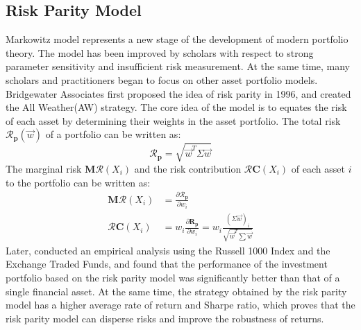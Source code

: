 \subsection{Risk Parity Model}
Markowitz model represents a new stage of the development of modern portfolio theory. The model has been improved by scholars with respect to strong parameter sensitivity and insufficient risk measurement. At the same time, many scholars and practitioners began to focus on other asset portfolio models.\\
Bridgewater Associates first proposed the idea of risk parity in 1996, and created the All Weather(AW) strategy. The core idea of the model is to equates the risk of each asset by determining their weights in the asset portfolio. The total risk $\boldsymbol{\mathcal{R}}_\mathbf{p}(\vec{w})$ of a portfolio can be written as:
 \begin{equation}
\boldsymbol{\mathcal{R}}_{\mathbf{p}}=\sqrt{\vec{w}^T \Sigma \vec{w}}  
 \end{equation}
The marginal risk $\boldsymbol{M}\boldsymbol{\mathcal{R}}(X_{i})$ and the risk contribution $\boldsymbol{\mathcal{R}}\boldsymbol{C}(X_{i})$ of each asset $i$ to the portfolio can be written as:
\begin{equation}
\begin{aligned}
\boldsymbol{M}\boldsymbol{\mathcal{R}}\left(X_i\right)&=\frac{\partial \boldsymbol{\mathcal{R}}_{\mathbf{p}}}{\partial w_i}\\
\boldsymbol{\mathcal{R}}\boldsymbol{C}\left(X_i\right)&=w_i \frac{\partial \boldsymbol{R}_\mathbf{p}}{\partial w_i}=w_i \frac{(\Sigma \vec{w})_i}{\sqrt{\vec{w}^T \sum \vec{w}}}  
    \end{aligned}
\end{equation}
Later, \cite{QE2002} conducted an empirical analysis using the Russell 1000 Index and the Exchange Traded Funds, and found that the performance of the investment portfolio based on the risk parity model was significantly better than that of a single financial asset. At the same time, the strategy obtained by the risk parity model has a higher average rate of return and Sharpe ratio, which proves that the risk parity model can disperse risks and improve the robustness of returns.